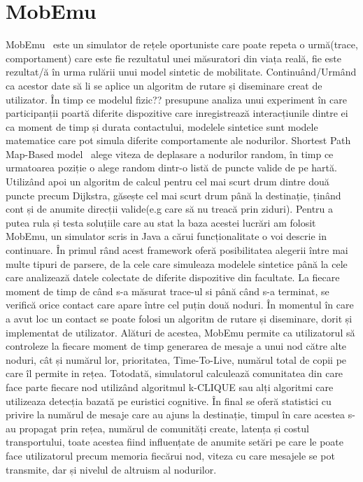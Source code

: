\documentclass[12pt,a4paper]{report}
\begin{document}
\section{MobEmu}
MobEmu~\cite{MobEmuArticle} este un simulator de rețele oportuniste care poate repeta o urmă(trace, comportament) care este fie rezultatul unei măsuratori din viața reală, fie este rezultat/ă în urma rulării unui model sintetic de mobilitate. Continuând/Urmând ca acestor date să li se aplice un algoritm de rutare și diseminare creat de utilizator.
În timp ce modelul fizic?? presupune analiza unui experiment în care participanții poartă diferite dispozitive care inregistrează interacțiunile dintre ei ca moment de timp și durata contactului, modelele sintetice sunt modele matematice care pot simula diferite comportamente ale nodurilor. Shortest Path Map-Based model~\cite{ShortestPathMapBased} alege viteza de deplasare a nodurilor random, în timp ce urmatoarea poziție o alege random dintr-o listă de puncte valide de pe hartă. Utilizând apoi un algoritm de calcul pentru cel mai scurt drum dintre două puncte precum Dijkstra, găsește cel mai scurt drum până la destinație, ținând cont și de anumite direcții valide(e.g care să nu treacă prin ziduri). 
Pentru a putea rula și testa soluțiile care au stat la baza acestei lucrări am folosit MobEmu, un simulator scris in Java a cărui funcționalitate o voi descrie in continuare. În primul rând acest framework oferă posibilitatea alegerii între mai multe tipuri de parsere, de la cele care simuleaza modelele sintetice până la cele care analizează datele colectate de diferite dispozitive din facultate. La fiecare moment de timp de când s-a măsurat trace-ul si până când s-a terminat, se verifică orice contact care apare între cel puțin două noduri. În momentul în care a avut loc un contact se poate folosi un algoritm de rutare și diseminare, dorit și implementat de utilizator. Alături de acestea, MobEmu permite ca utilizatorul să controleze la fiecare moment de timp generarea de mesaje a unui nod către alte noduri, cât și numărul lor, prioritatea, Time-To-Live, numărul total de copii pe care îl permite in rețea. Totodată, simulatorul calculează comunitatea din care face parte fiecare nod utilizând algoritmul k-CLIQUE sau alți algoritmi care utilizeaza detecția bazată pe euristici cognitive. În final se oferă statistici cu privire la numărul de mesaje care au ajuns la destinație, timpul în care acestea s-au propagat prin rețea, numărul de comunități create, latența și costul transportului, toate acestea fiind influențate de anumite setări pe care le poate face utilizatorul precum memoria fiecărui nod, viteza cu care mesajele se pot transmite, dar și nivelul de altruism al nodurilor.
\end{document}

